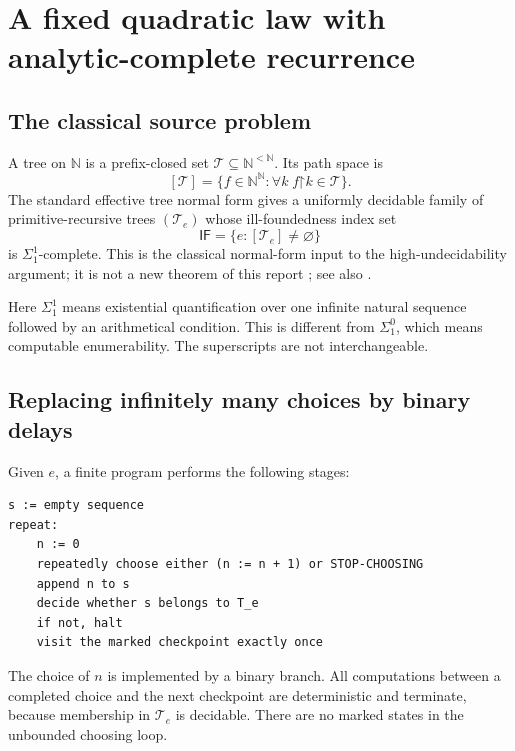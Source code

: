 \documentclass[11pt,letterpaper]{article}
\theoremstyle{definition}
\theoremstyle{remark}
\newcommand{\N}{\mathbb N}
\newcommand{\pref}{\mathord{\upharpoonright}}
\newcommand{\1}{\mathbf 1}
\newcommand{\T}{\mathcal T}
\newcommand{\srctag}[1]{\texorpdfstring{\hspace{0.4em}{\normalfont\small\color{accent}[source #1]}}{ [source #1]}}
\begin{document}
\section{A fixed quadratic law with analytic-complete recurrence\srctag{11}}
\label{lbh:ql:sec:analytic}

\subsection{The classical source problem}
A tree on $\N$ is a prefix-closed set
$\T\subseteq\N^{<\N}$. Its path space is
\[
 [\T]=\{f\in\N^\N:\forall k\;f\pref k\in\T\}.
\]
The standard effective tree normal form gives a uniformly decidable family
of primitive-recursive trees $(\T_e)$ whose ill-foundedness index set
\begin{equation}\label{lbh:ql:eq:IF}
 \mathsf{IF}=\{e:[\T_e]\neq\varnothing\}
\end{equation}
is $\Sigma^1_1$-complete. This is the classical normal-form input to the
high-undecidability argument; it is not a new theorem of this report
\cite{harel1986}; see also \cite[Theorem 2.6(g)]{cenzer-marek-remmel}.

Here $\Sigma^1_1$ means existential quantification over one infinite natural
sequence followed by an arithmetical condition. This is different from
$\Sigma^0_1$, which means computable enumerability. The superscripts are not
interchangeable.

\subsection{Replacing infinitely many choices by binary delays}
Given $e$, a finite program performs the following stages:
\begin{lstlisting}
s := empty sequence
repeat:
    n := 0
    repeatedly choose either (n := n + 1) or STOP-CHOOSING
    append n to s
    decide whether s belongs to T_e
    if not, halt
    visit the marked checkpoint exactly once
\end{lstlisting}
The choice of $n$ is implemented by a binary branch. All computations between
a completed choice and the next checkpoint are deterministic and terminate,
because membership in $\T_e$ is decidable. There are no marked states in the
unbounded choosing loop.
\end{document}
